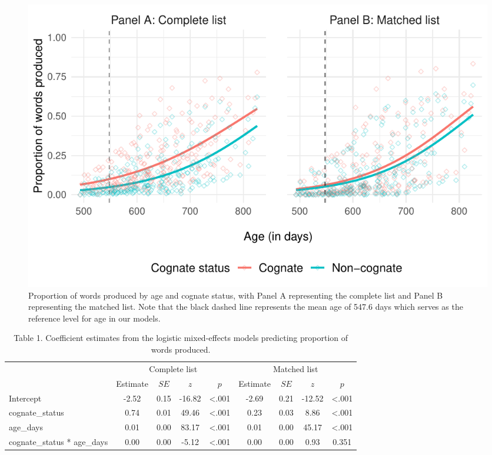 \documentclass[
  ,man,floatsintext]{apa6}
\begin{document}
\begin{figure}[H]

{\centering \includegraphics[width=1.2\linewidth]{CogVocab_paper_files/figure-latex/Fig1-1} 

}

\caption{Proportion of words produced by age and cognate status, with Panel A representing the complete list and Panel B representing the matched list. Note that the black dashed line represents the mean age of 547.6 days which serves as the reference level for age in our models.}\label{fig:Fig1}
\end{figure}

\begin{table}[H]

\begin{center}
\begin{threeparttable}

\caption{\label{tab:Table 1}Table 1. Coefficient estimates from the logistic mixed-effects models predicting proportion of words produced.}

\begin{tabular}{lcccccccc}
\toprule
 & \multicolumn{4}{c}{Complete list} & \multicolumn{4}{c}{Matched list} \\
\cmidrule(r){2-5} \cmidrule(r){6-9}
 & Estimate & $SE$ & $z$ & $p$ & Estimate & $SE$ & $z$ & $p$\\
\midrule
Intercept & -2.52 & 0.15 & -16.82 & <.001 & -2.69 & 0.21 & -12.52 & <.001\\
cognate\_status & 0.74 & 0.01 & 49.46 & <.001 & 0.23 & 0.03 & 8.86 & <.001\\
age\_days & 0.01 & 0.00 & 83.17 & <.001 & 0.01 & 0.00 & 45.17 & <.001\\
cognate\_status * age\_days & 0.00 & 0.00 & -5.12 & <.001 & 0.00 & 0.00 & 0.93 & 0.351\\
\bottomrule
\end{tabular}

\end{threeparttable}
\end{center}

\end{table}
\end{document}
